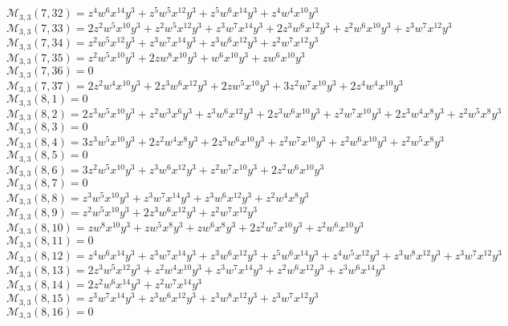 \documentclass[12pt]{memoireuqam1.3}
\begin{document}
$\mathcal{M}_{3,3}(7,32)=z^4w^6x^{14}y^3+z^5w^5x^{12}y^3+z^5w^6x^{14}y^3+z^4w^4x^{10}y^3$\\
$\mathcal{M}_{3,3}(7,33)=2z^2w^5x^{10}y^3+z^2w^5x^{12}y^3+z^3w^7x^{14}y^3+2z^3w^6x^{12}y^3+z^2w^6x^{10}y^3+z^3w^7x^{12}y^3$\\
$\mathcal{M}_{3,3}(7,34)=z^2w^5x^{12}y^3+z^3w^7x^{14}y^3+z^3w^6x^{12}y^3+z^2w^7x^{12}y^3$\\
$\mathcal{M}_{3,3}(7,35)=z^2w^5x^{10}y^3+2zw^8x^{10}y^3+w^6x^{10}y^3+zw^6x^{10}y^3$\\
$\mathcal{M}_{3,3}(7,36)=0$\\
$\mathcal{M}_{3,3}(7,37)=2z^2w^4x^{10}y^3+2z^3w^6x^{12}y^3+2zw^5x^{10}y^3+3z^2w^7x^{10}y^3+2z^4w^4x^{10}y^3$\\
$\mathcal{M}_{3,3}(8,1)=0$\\
$\mathcal{M}_{3,3}(8,2)=2z^3w^5x^{10}y^3+z^2w^3x^6y^3+z^3w^6x^{12}y^3+2z^3w^6x^{10}y^3+z^2w^7x^{10}y^3+2z^3w^4x^8y^3+z^2w^5x^8y^3$\\
$\mathcal{M}_{3,3}(8,3)=0$\\
$\mathcal{M}_{3,3}(8,4)=3z^3w^5x^{10}y^3+2z^2w^4x^8y^3+2z^3w^6x^{10}y^3+z^2w^7x^{10}y^3+z^2w^6x^{10}y^3+z^2w^5x^8y^3$\\
$\mathcal{M}_{3,3}(8,5)=0$\\
$\mathcal{M}_{3,3}(8,6)=3z^2w^5x^{10}y^3+z^3w^6x^{12}y^3+z^2w^7x^{10}y^3+2z^2w^6x^{10}y^3$\\
$\mathcal{M}_{3,3}(8,7)=0$\\
$\mathcal{M}_{3,3}(8,8)=z^3w^5x^{10}y^3+z^3w^7x^{14}y^3+z^3w^6x^{12}y^3+z^2w^4x^8y^3$\\
$\mathcal{M}_{3,3}(8,9)=z^2w^5x^{10}y^3+2z^3w^6x^{12}y^3+z^2w^7x^{12}y^3$\\
$\mathcal{M}_{3,3}(8,10)=zw^8x^{10}y^3+zw^5x^8y^3+zw^6x^8y^3+2z^2w^7x^{10}y^3+z^2w^6x^{10}y^3$\\
$\mathcal{M}_{3,3}(8,11)=0$\\
$\mathcal{M}_{3,3}(8,12)=z^4w^6x^{14}y^3+z^3w^7x^{14}y^3+z^3w^6x^{12}y^3+z^5w^6x^{14}y^3+z^4w^5x^{12}y^3+z^3w^8x^{12}y^3+z^3w^7x^{12}y^3$\\
$\mathcal{M}_{3,3}(8,13)=2z^3w^5x^{12}y^3+z^2w^4x^{10}y^3+z^3w^7x^{14}y^3+z^2w^6x^{12}y^3+z^3w^6x^{14}y^3$\\
$\mathcal{M}_{3,3}(8,14)=2z^2w^6x^{14}y^3+z^2w^7x^{14}y^3$\\
$\mathcal{M}_{3,3}(8,15)=z^3w^7x^{14}y^3+z^3w^6x^{12}y^3+z^3w^8x^{12}y^3+z^3w^7x^{12}y^3$\\
$\mathcal{M}_{3,3}(8,16)=0$\\
\end{document}

